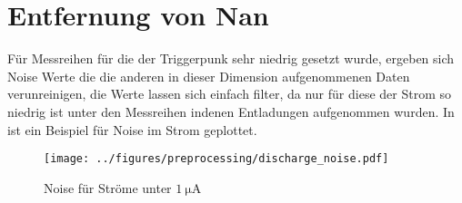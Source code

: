 \section{Entfernung von Nan}
\label{sec:nan_removal}
Für Messreihen für die der Triggerpunk sehr niedrig gesetzt wurde, ergeben sich Noise Werte die die anderen in dieser Dimension aufgenommenen Daten verunreinigen, die Werte lassen sich einfach filter, da nur für diese der Strom so niedrig ist unter den Messreihen indenen Entladungen aufgenommen wurden. In  ist ein Beispiel für Noise im Strom geplottet.

\begin{figure}[htbp]
    \centering
    \texttt{[image: ../figures/preprocessing/discharge\_noise.pdf]}
    \caption{Noise für Ströme unter \(\SI{1}{\micro\ampere}\)}
    \label{fig:noise}
\end{figure}


